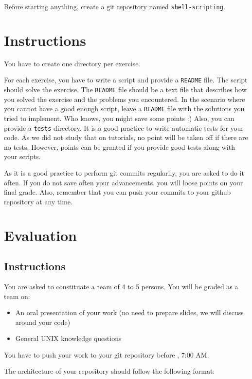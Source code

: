 \documentclass[12pt]{article}
\begin{document}
Before starting anything, create a git repository named \texttt{shell-scripting}.

\section{Instructions}

You have to create one directory per exercise.

For each exercise, you have to write a script and provide a \texttt{README} file. The script should solve the exercise. The \texttt{README} file should be a text file that describes how you solved the exercise and the problems you encountered. In the scenario where you cannot have a good enough script, leave a \texttt{README} file with the solutions you tried to implement. Who knows, you might save some points :) Also, you can provide a \texttt{tests} directory. It is a good practice to write automatic tests for your code. As we did not study that on tutorials, no point will be taken off if there are no tests. However, points can be granted if you provide good tests along with your scripts.

As it is a good practice to perform git commits regularily, you are asked to do it often. If you do not save often your advancements, you will loose points on your final grade. Also, remember that you can push your commits to your github repository at any time.

\section{Evaluation}
\subsection{Instructions}

You are asked to constituate a team of 4 to 5 persons. You will be graded as a team on:
\begin{itemize}
	\item An oral presentation of your work (no need to prepare slides, we will discuss around your code)
	\item General UNIX knowledge questions
\end{itemize}

You have to push your work to your git repository before , 7:00 AM.

The architecture of your repository should follow the following format:
\end{document}
